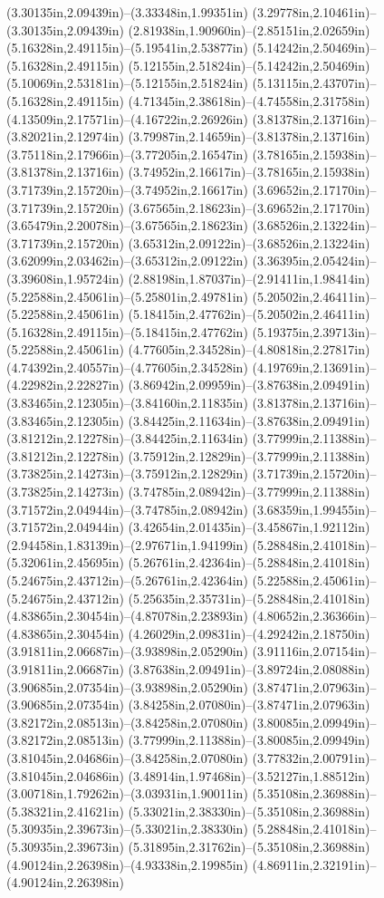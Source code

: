 (3.30135in,2.09439in)--(3.33348in,1.99351in) (3.29778in,2.10461in)--(3.30135in,2.09439in) (2.81938in,1.90960in)--(2.85151in,2.02659in) (5.16328in,2.49115in)--(5.19541in,2.53877in) (5.14242in,2.50469in)--(5.16328in,2.49115in) (5.12155in,2.51824in)--(5.14242in,2.50469in) (5.10069in,2.53181in)--(5.12155in,2.51824in) (5.13115in,2.43707in)--(5.16328in,2.49115in) (4.71345in,2.38618in)--(4.74558in,2.31758in) (4.13509in,2.17571in)--(4.16722in,2.26926in) (3.81378in,2.13716in)--(3.82021in,2.12974in) (3.79987in,2.14659in)--(3.81378in,2.13716in) (3.75118in,2.17966in)--(3.77205in,2.16547in) (3.78165in,2.15938in)--(3.81378in,2.13716in) (3.74952in,2.16617in)--(3.78165in,2.15938in) (3.71739in,2.15720in)--(3.74952in,2.16617in) (3.69652in,2.17170in)--(3.71739in,2.15720in) (3.67565in,2.18623in)--(3.69652in,2.17170in) (3.65479in,2.20078in)--(3.67565in,2.18623in) (3.68526in,2.13224in)--(3.71739in,2.15720in) (3.65312in,2.09122in)--(3.68526in,2.13224in) (3.62099in,2.03462in)--(3.65312in,2.09122in) (3.36395in,2.05424in)--(3.39608in,1.95724in) (2.88198in,1.87037in)--(2.91411in,1.98414in) (5.22588in,2.45061in)--(5.25801in,2.49781in) (5.20502in,2.46411in)--(5.22588in,2.45061in) (5.18415in,2.47762in)--(5.20502in,2.46411in) (5.16328in,2.49115in)--(5.18415in,2.47762in) (5.19375in,2.39713in)--(5.22588in,2.45061in) (4.77605in,2.34528in)--(4.80818in,2.27817in) (4.74392in,2.40557in)--(4.77605in,2.34528in) (4.19769in,2.13691in)--(4.22982in,2.22827in) (3.86942in,2.09959in)--(3.87638in,2.09491in) (3.83465in,2.12305in)--(3.84160in,2.11835in) (3.81378in,2.13716in)--(3.83465in,2.12305in) (3.84425in,2.11634in)--(3.87638in,2.09491in) (3.81212in,2.12278in)--(3.84425in,2.11634in) (3.77999in,2.11388in)--(3.81212in,2.12278in) (3.75912in,2.12829in)--(3.77999in,2.11388in) (3.73825in,2.14273in)--(3.75912in,2.12829in) (3.71739in,2.15720in)--(3.73825in,2.14273in) (3.74785in,2.08942in)--(3.77999in,2.11388in) (3.71572in,2.04944in)--(3.74785in,2.08942in) (3.68359in,1.99455in)--(3.71572in,2.04944in) (3.42654in,2.01435in)--(3.45867in,1.92112in) (2.94458in,1.83139in)--(2.97671in,1.94199in) (5.28848in,2.41018in)--(5.32061in,2.45695in) (5.26761in,2.42364in)--(5.28848in,2.41018in) (5.24675in,2.43712in)--(5.26761in,2.42364in) (5.22588in,2.45061in)--(5.24675in,2.43712in) (5.25635in,2.35731in)--(5.28848in,2.41018in) (4.83865in,2.30454in)--(4.87078in,2.23893in) (4.80652in,2.36366in)--(4.83865in,2.30454in) (4.26029in,2.09831in)--(4.29242in,2.18750in) (3.91811in,2.06687in)--(3.93898in,2.05290in) (3.91116in,2.07154in)--(3.91811in,2.06687in) (3.87638in,2.09491in)--(3.89724in,2.08088in) (3.90685in,2.07354in)--(3.93898in,2.05290in) (3.87471in,2.07963in)--(3.90685in,2.07354in) (3.84258in,2.07080in)--(3.87471in,2.07963in) (3.82172in,2.08513in)--(3.84258in,2.07080in) (3.80085in,2.09949in)--(3.82172in,2.08513in) (3.77999in,2.11388in)--(3.80085in,2.09949in) (3.81045in,2.04686in)--(3.84258in,2.07080in) (3.77832in,2.00791in)--(3.81045in,2.04686in) (3.48914in,1.97468in)--(3.52127in,1.88512in) (3.00718in,1.79262in)--(3.03931in,1.90011in) (5.35108in,2.36988in)--(5.38321in,2.41621in) (5.33021in,2.38330in)--(5.35108in,2.36988in) (5.30935in,2.39673in)--(5.33021in,2.38330in) (5.28848in,2.41018in)--(5.30935in,2.39673in) (5.31895in,2.31762in)--(5.35108in,2.36988in) (4.90124in,2.26398in)--(4.93338in,2.19985in) (4.86911in,2.32191in)--(4.90124in,2.26398in) 